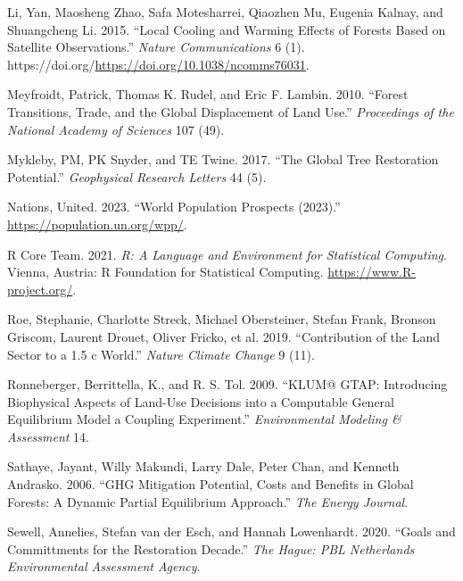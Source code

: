 \documentclass[
]{article}
\newlength{\cslhangindent}
\newlength{\cslentryspacingunit} %
\newenvironment{CSLReferences}[2] %
 {%
  \setlength{\parindent}{0pt}
  \ifodd #1
  \let\oldpar\par
  \def\par{\hangindent=\cslhangindent\oldpar}
  \fi
  \setlength{\parskip}{#2\cslentryspacingunit}
 }%
 {}
\begin{document}
\begin{CSLReferences}{1}{0}
\leavevmode{}%
Li, Yan, Maosheng Zhao, Safa Motesharrei, Qiaozhen Mu, Eugenia Kalnay, and Shuangcheng Li. 2015. {``Local Cooling and Warming Effects of Forests Based on Satellite Observations.''} \emph{Nature Communications} 6 (1). https://doi.org/\url{https://doi.org/10.1038/ncomms76031}.

\leavevmode{}%
Meyfroidt, Patrick, Thomas K. Rudel, and Eric F. Lambin. 2010. {``Forest Transitions, Trade, and the Global Displacement of Land Use.''} \emph{Proceedings of the National Academy of Sciences} 107 (49).

\leavevmode{}%
Mykleby, PM, PK Snyder, and TE Twine. 2017. {``The Global Tree Restoration Potential.''} \emph{Geophysical Research Letters} 44 (5).

\leavevmode{}%
Nations, United. 2023. {``World Population Prospects (2023).''} \url{https://population.un.org/wpp/}.

\leavevmode{}%
R Core Team. 2021. \emph{R: A Language and Environment for Statistical Computing}. Vienna, Austria: R Foundation for Statistical Computing. \url{https://www.R-project.org/}.

\leavevmode{}%
Roe, Stephanie, Charlotte Streck, Michael Obersteiner, Stefan Frank, Bronson Griscom, Laurent Drouet, Oliver Fricko, et al. 2019. {``Contribution of the Land Sector to a 1.5 c World.''} \emph{Nature Climate Change} 9 (11).

\leavevmode{}%
Ronneberger, Berrittella, K., and R. S. Tol. 2009. {``KLUM@ GTAP: Introducing Biophysical Aspects of Land-Use Decisions into a Computable General Equilibrium Model a Coupling Experiment.''} \emph{Environmental Modeling \& Assessment} 14.

\leavevmode{}%
Sathaye, Jayant, Willy Makundi, Larry Dale, Peter Chan, and Kenneth Andrasko. 2006. {``GHG Mitigation Potential, Costs and Benefits in Global Forests: A Dynamic Partial Equilibrium Approach.''} \emph{The Energy Journal}.

\leavevmode{}%
Sewell, Annelies, Stefan van der Esch, and Hannah Lowenhardt. 2020. {``Goals and Committments for the Restoration Decade.''} \emph{The Hague: PBL Netherlands Environmental Assessment Agency}.


\end{CSLReferences}
\end{document}
